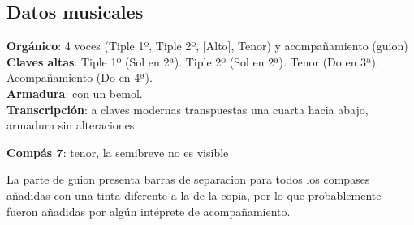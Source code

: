
\subsection*{Datos musicales}

\noindent \textbf{Orgánico}: 4 voces (Tiple 1º, Tiple 2º, [Alto], Tenor) y acompañamiento (guion)\\
\textbf{Claves altas}: Tiple 1º (Sol en 2ª). Tiple 2º (Sol en 2ª). Tenor (Do en 3ª). Acompañamiento (Do en 4ª).\\
\textbf{Armadura}: con un bemol.\\
\textbf{Transcripción}: a claves modernas transpuestas una cuarta hacia abajo, armadura sin alteraciones.



\noindent \textbf{Compás 7}: tenor, la semibreve no es visible


\noindent La parte de guion presenta barras de separacion para todos los compases añadidas con una tinta diferente a la de la copia, por lo que probablemente fueron añadidas por algún intéprete de acompañamiento.


